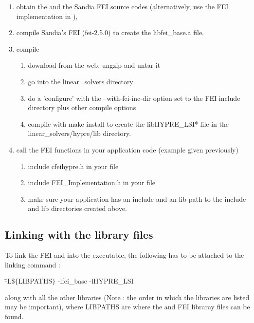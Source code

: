 \begin{enumerate}

\item obtain the \hypre{} and the Sandia FEI source codes (alternatively, use
      the {\sf FEI} implementation in \hypre{}),
\item compile Sandia's {\sf FEI} (fei-2.5.0) to create the
      {\sf libfei\_base.a} file.
\item compile \hypre{} 
\begin{enumerate}
\item download \hypre{} from the web, ungzip and untar it
\item go into the {\sf linear\_solvers} directory
\item do a 'configure' with the {\sf --with-fei-inc-dir} option set to
      the {\sf FEI} include directory plus other compile options
\item compile with {\sf make install} to create the
      {\sf libHYPRE\_LSI*} file in the {\sf linear\_solvers/hypre/lib}
      directory.
\end{enumerate}
\item call the {\sf FEI} functions in your application code (example given
      previously)
\begin{enumerate}
\item include {\sf cfei\-hypre.h} in your file 
\item include {\sf FEI\_Implementation.h} in your file 
\item make sure your application has an {\sf include} and an {\sf lib} path 
      to the {\sf include} and {\sf lib} directories created above. 
\end{enumerate}

\end{enumerate}

\subsection{Linking with the library files}

To link the {\sf FEI} and \hypre{} into the executable, the following has to be
attached to the linking command :

\begin{tabbing}
\hspace{0.5in} \= {\sf -L\$$\{$LIBPATHS$\}$ -lfei\_base -lHYPRE\_LSI} 
\end{tabbing}
along with all the other libraries (Note : the order in which the libraries are
listed may be important), where {\sf LIBPATHS} are where 
the \hypre{} and {\sf FEI} libraray files can be found.  


